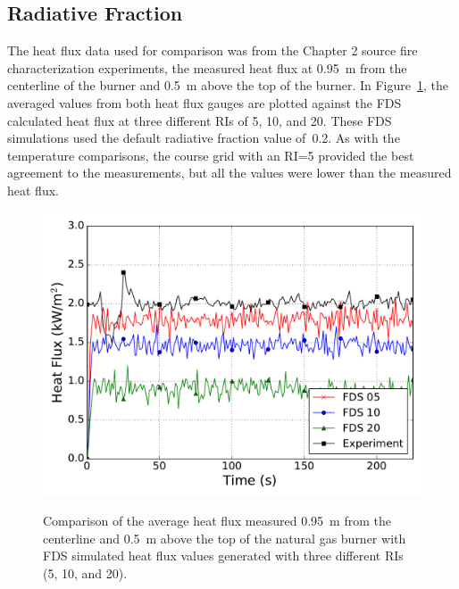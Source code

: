 \documentclass[twoside]{uocthesis}
\begin{document}
{\subsection{Radiative Fraction}

The heat flux data used for comparison was from the Chapter 2 source fire characterization experiments, the measured heat flux at 0.95~m from the centerline of the burner and 0.5~m above the top of the burner.  In Figure~\ref{FHNG01_HF_RI}, the averaged values from both heat flux gauges are plotted against the FDS calculated heat flux at three different RIs of 5, 10, and 20.  These FDS simulations used the default radiative fraction value of~0.2.  As with the temperature comparisons, the course grid with an RI=5 provided the best agreement to the measurements, but all the values were lower than the measured heat flux.  

\begin{figure}
	\includegraphics[width=5in]{../Figures/FHNG01_HF_RI} \\
	\caption[Comparison of the average heat flux measured 0.95~m from the centerline and 0.5~m above the top of the natural gas burner with FDS simulated heat flux values.]{Comparison of the average heat flux measured 0.95~m from the centerline and 0.5~m above the top of the natural gas burner with FDS simulated heat flux values generated with three different RIs (5, 10, and 20).}
	\label{FHNG01_HF_RI}
\end{figure}

}
\end{document}
